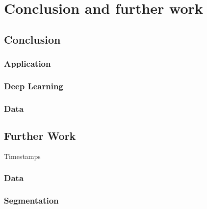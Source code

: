 \chapter{Conclusion and further work}

\section{Conclusion}

\subsection{Application}

\subsection{Deep Learning}

\subsection{Data}


\section{Further Work}


Timestamps


\subsection{Data}

\subsection{Segmentation}

